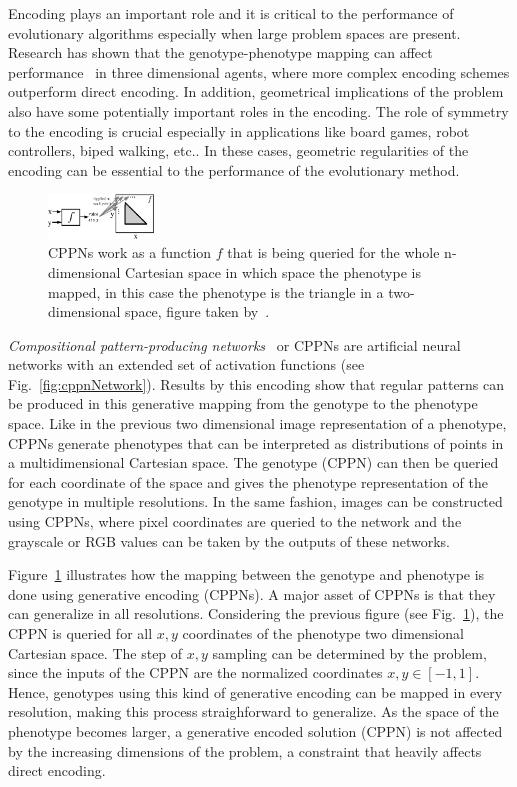 \documentclass{sig-alternate}
\begin{document}
Encoding plays an important role and it is critical to the performance of evolutionary algorithms especially when large problem spaces are present. Research has shown that the genotype-phenotype mapping can affect performance~\cite{komosinski2001comparison} in three dimensional agents, where more complex encoding schemes outperform direct encoding. In addition, geometrical implications of the problem also have some potentially important roles in the encoding. The role of symmetry to the encoding is crucial especially in applications like board games, robot controllers, biped walking, etc.. In these cases, geometric regularities of the encoding can be essential to the performance of the evolutionary method.

\begin{figure}[t!]
\centering
\includegraphics[width=0.25\textwidth]{../Figures/Misc/cppnResolution.eps}
\caption{CPPNs work as a function $f$ that is being queried for the whole n-dimensional Cartesian space in which space the phenotype is mapped, in this case the phenotype is the triangle in a two-dimensional space, figure taken by~\cite{stanley2007compositional}.}
\label{fig:cppnResolution}
\end{figure}

\emph{Compositional pattern-producing networks}~\cite{stanley2007compositional} or CPPNs are artificial neural networks with an extended set of activation functions (see Fig.~\ref{fig:cppnNetwork}). Results by this encoding show that regular patterns can be produced in this generative mapping from the genotype to the phenotype space. Like in the previous two dimensional image representation of a phenotype, CPPNs generate phenotypes that can be interpreted as distributions of points in a multidimensional Cartesian space. The genotype (CPPN) can then be queried for each coordinate of the space and gives the phenotype representation of the genotype in multiple resolutions. In the same fashion, images can be constructed using CPPNs, where pixel coordinates are queried to the network and the grayscale or RGB values can be taken by the outputs of these networks. 


Figure~\ref{fig:cppnResolution} illustrates how the mapping between the genotype and phenotype is done using generative encoding (CPPNs). A major asset of CPPNs is that they can generalize in all resolutions. Considering the previous figure (see Fig.~\ref{fig:cppnResolution}), the CPPN is queried for all $x,y$ coordinates of the phenotype two dimensional Cartesian space. The step of $x,y$ sampling can be determined by the problem, since the inputs of the CPPN are the normalized coordinates $x,y \in [-1,1]$. Hence, genotypes using this kind of generative encoding can be mapped in every resolution, making this process straighforward to generalize. As the space of the phenotype becomes larger, a generative encoded solution (CPPN) is not affected by the increasing dimensions of the problem, a constraint that heavily affects direct encoding.
\end{document}
